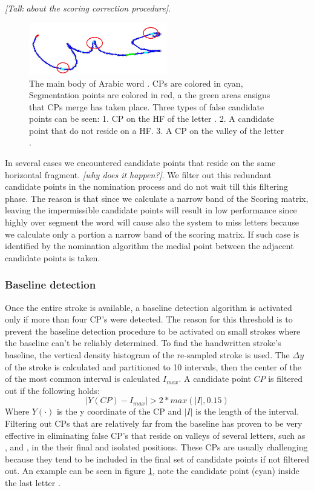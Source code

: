 \documentclass[journal,compsoc]{IEEEtran}
\begin{document}
\emph{[Talk about the scoring correction procedure]}.

\begin{figure}
\centering
\includegraphics[width=6cm]{./figures/candidate_in_no_horizontal}
\caption{The main body of Arabic word . CPs are colored in cyan, Segmentation points are colored in red, a the green areas ensigns that CPs merge has taken place. Three types of false candidate points can be seen: 1. CP on the HF of the letter . 2. A candidate point that do not reside on a HF. 3. A CP on the valley of the letter . }
\label{fig:candidate_in_no_horizontal}
\end{figure}

In several cases we encountered candidate points that reside on the same horizontal fragment. \emph{[why does it happen?]}. We filter out this redundant candidate points in the nomination process and do not wait till this filtering phase. The reason is that since we calculate a narrow band of the Scoring matrix, leaving the impermissible candidate points will result in low performance since highly over segment the word will cause also the system to miss letters because we calculate only a portion a narrow band of the scoring matrix. If such case is identified by the nomination algorithm the medial point between the adjacent candidate points is taken.

\subsubsection{Baseline detection}
Once the entire stroke is available, a baseline detection algorithm is activated only if more than four CP's were detected. The reason for this threshold is to prevent the baseline detection procedure to be activated on small strokes where the baseline can't be reliably determined. To find the handwritten stroke's baseline, the vertical density histogram of the re-sampled stroke is used. The $\Delta y$ of the stroke is calculated and partitioned to 10 intervals, then the center of the of the most common interval is calculated $I_{max}$. A candidate point $CP$ is filtered out if the following holds:
\begin{equation}
|Y(CP)-I_{max}|>2*max(|I|,0.15) 
\end{equation}
Where $Y(\cdot)$ is the y coordinate of the CP and $|I|$ is the length of the interval. 
Filtering out CPs that are relatively far from the baseline has proven to be very effective in eliminating false CP's that reside on valleys of several letters, such as ,  and , in the their final and isolated positions. These CPs are usually challenging because they tend to be included in the final set of candidate points if not filtered out. An example can be seen in figure \ref{fig:candidate_in_no_horizontal}, note the candidate point (cyan) inside the last letter . 
\end{document}
